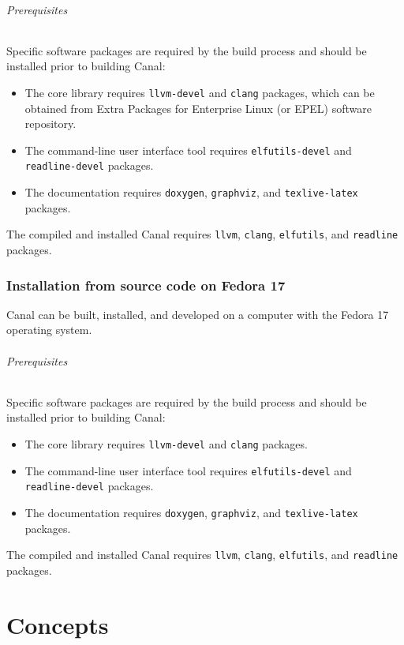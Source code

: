 \documentclass[a4paper]{book}
\begin{document}
\paragraph*{Prerequisites}
Specific software packages are required by the build process and
should be installed prior to building Canal:
\begin{itemize}
\item The core library requires \texttt{llvm-devel} and \texttt{clang}
  packages, which can be obtained from Extra Packages for Enterprise
  Linux (or EPEL) software repository.
\item The command-line user interface tool requires
  \texttt{elfutils-devel} and \texttt{readline-devel} packages.
\item The documentation requires \texttt{doxygen}, \texttt{graphviz},
  and \texttt{texlive-latex} packages.
\end{itemize}
The compiled and installed Canal requires \texttt{llvm},
\texttt{clang}, \texttt{elfutils}, and \texttt{readline} packages.

\section{Installation from source code on Fedora 17}

Canal can be built, installed, and developed on a computer with the
Fedora 17 operating system.

\paragraph*{Prerequisites}
Specific software packages are required by the build process and
should be installed prior to building Canal:
\begin{itemize}
\item The core library requires \texttt{llvm-devel} and \texttt{clang}
  packages.
\item The command-line user interface tool requires
  \texttt{elfutils-devel} and \texttt{readline-devel} packages.
\item The documentation requires \texttt{doxygen}, \texttt{graphviz},
  and \texttt{texlive-latex} packages.
\end{itemize}
The compiled and installed Canal requires \texttt{llvm},
\texttt{clang}, \texttt{elfutils}, and \texttt{readline} packages.


\part{Concepts}
\end{document}
